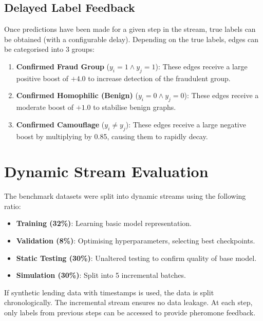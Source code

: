 \subsection{Delayed Label Feedback}
Once predictions have been made for a given step in the stream, true labels can be obtained (with a configurable delay). Depending on the true labels, edges can be categorised into 3 groups:
\begin{enumerate}
    \item \textbf{Confirmed Fraud Group} ($y_i = 1 \land y_j = 1$): These edges receive a large positive boost of $+4.0$ to increase detection of the fraudulent group.
    \item \textbf{Confirmed Homophilic (Benign)} ($y_i = 0 \land y_j = 0$): These edges receive a moderate boost of $+1.0$ to stabilise benign graphs.
    \item \textbf{Confirmed Camouflage} ($y_i \neq y_j$): These edges receive a large negative boost by multiplying by 0.85, causing them to rapidly decay.
\end{enumerate}

\section[Dynamic Stream Evaluation]{Dynamic Stream Evaluation}
\label{sec:stream_evaluation}

The benchmark datasets were split into dynamic streams using the following ratio:
\begin{itemize}
    \item \textbf{Training (32\%)}: Learning basic model representation.
    \item \textbf{Validation (8\%)}: Optimising hyperparameters, selecting best checkpoints.
    \item \textbf{Static Testing (30\%)}: Unaltered testing to confirm quality of base model.
    \item \textbf{Simulation (30\%)}: Split into 5 incremental batches.
\end{itemize}
If synthetic lending data with timestamps is used, the data is split chronologically. The incremental stream ensures no data leakage. At each step, only labels from previous steps can be accessed to provide pheromone feedback.
